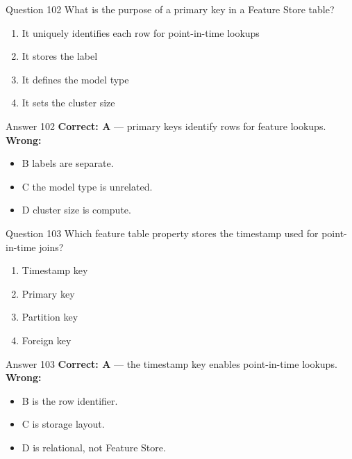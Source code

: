 \documentclass[aspectratio=169,11pt]{beamer}
\begin{document}
	\begin{frame}{Question 102}
		What is the purpose of a primary key in a Feature Store table?
		\begin{enumerate}[label=\Alph*.]
			\item It uniquely identifies each row for point-in-time lookups
			\item It stores the label
			\item It defines the model type
			\item It sets the cluster size
		\end{enumerate}
	\end{frame}
	\begin{frame}{Answer 102}
		\textbf{Correct: A} --- primary keys identify rows for feature lookups.\\
		\vspace{0.5em}
		\textbf{Wrong:}
		\begin{itemize}
			\item B labels are separate.
			\item C the model type is unrelated.
			\item D cluster size is compute.
		\end{itemize}
	\end{frame}
	
	\begin{frame}{Question 103}
		Which feature table property stores the timestamp used for point-in-time joins?
		\begin{enumerate}[label=\Alph*.]
			\item Timestamp key
			\item Primary key
			\item Partition key
			\item Foreign key
		\end{enumerate}
	\end{frame}
	\begin{frame}{Answer 103}
		\textbf{Correct: A} --- the timestamp key enables point-in-time lookups.\\
		\vspace{0.5em}
		\textbf{Wrong:}
		\begin{itemize}
			\item B is the row identifier.
			\item C is storage layout.
			\item D is relational, not Feature Store.
		\end{itemize}
	\end{frame}
	
\end{document}
